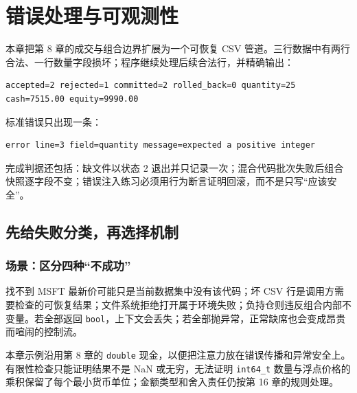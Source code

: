 \chapter{错误处理与可观测性}


本章把第 8 章的成交与组合边界扩展为一个可恢复 CSV 管道。三行数据中有两行合法、一行数量字段损坏；程序继续处理后续合法行，并精确输出：

\begin{lstlisting}
accepted=2 rejected=1 committed=2 rolled_back=0 quantity=25 cash=7515.00 equity=9990.00
\end{lstlisting}

标准错误只出现一条：

\begin{lstlisting}
error line=3 field=quantity message=expected a positive integer
\end{lstlisting}

完成判据还包括：缺文件以状态 2 退出并只记录一次；混合代码批次失败后组合快照逐字段不变；错误注入练习必须用行为断言证明回滚，而不是只写“应该安全”。

\section{先给失败分类，再选择机制}

\subsection{场景：区分四种“不成功”}

找不到 MSFT 最新价可能只是当前数据集中没有该代码；坏 CSV 行是调用方需要检查的可恢复结果；文件系统拒绝打开属于环境失败；负持仓则违反组合内部不变量。若全部返回 \texttt{bool}，上下文会丢失；若全部抛异常，正常缺席也会变成昂贵而喧闹的控制流。

本章示例沿用第 8 章的 \texttt{double} 现金，以便把注意力放在错误传播和异常安全上。有限性检查只能证明结果不是 NaN 或无穷，无法证明 \texttt{int64\_t} 数量与浮点价格的乘积保留了每个最小货币单位；金额类型和舍入责任仍按第 16 章的规则处理。



